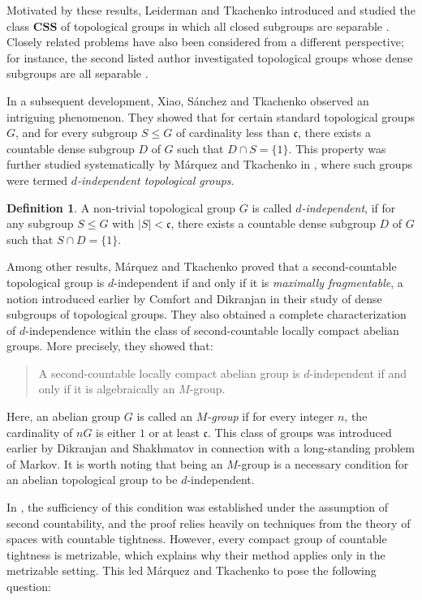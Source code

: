 \documentclass[12pt]{amsart}
\theoremstyle{definition}
\newtheorem{definition}[theorem]{Definition}
\theoremstyle{remark}
\def\c {{\mathfrak{c}}}
\begin{document}
Motivated by these results, Leiderman and Tkachenko introduced and studied the class $\mathbf{CSS}$ of topological groups in which all closed subgroups are separable \cite{LT}.
Closely related problems have also been considered from a different perspective; for instance, the second listed author investigated topological groups whose dense subgroups are all separable \cite{Pe}.

In a subsequent development, Xiao, Sánchez and Tkachenko \cite{XST} observed an intriguing phenomenon.
They showed that for certain standard topological groups $G$, and for every subgroup $S\leq G$ of cardinality less than $\mathfrak{c}$, there exists a countable dense subgroup $D$ of $G$ such that $D\cap S=\{1\}$.
This property was further studied systematically by Márquez and Tkachenko in \cite{MT}, where such groups were termed \emph{$d$-independent topological groups}.

\begin{definition}A non-trivial topological group $G$ is called \emph{$d$-independent}, if for any subgroup $S\leq G$ with $|S|<\c$, there exists a countable dense subgroup $D$ of $G$ such that $S\cap D=\{1\}$.\end{definition}

Among other results, Márquez and Tkachenko proved that a second-countable topological group is $d$-independent if and only if it is \emph{maximally fragmentable}, a notion introduced earlier by Comfort and Dikranjan in their study of dense subgroups of topological groups.
They also obtained a complete characterization of $d$-independence within the class of second-countable locally compact abelian groups.
More precisely, they showed that:

\begin{quote}
A second-countable locally compact abelian group is $d$-independent if and only if it is algebraically an $M$-group.
\end{quote}

Here, an abelian group $G$ is called an \emph{$M$-group} if for every integer $n$, the cardinality of $nG$ is either $1$ or at least $\mathfrak{c}$.
This class of groups was introduced earlier by Dikranjan and Shakhmatov \cite{DS} in connection with a long-standing problem of Markov.
It is worth noting that being an $M$-group is a necessary condition for an abelian topological group to be $d$-independent.

In \cite{MT}, the sufficiency of this condition was established under the assumption of second countability, and the proof relies heavily on techniques from the theory of spaces with countable tightness.
However, every compact group of countable tightness is metrizable, which explains why their method applies only in the metrizable setting.
This led Márquez and Tkachenko to pose the following question:
\end{document}

